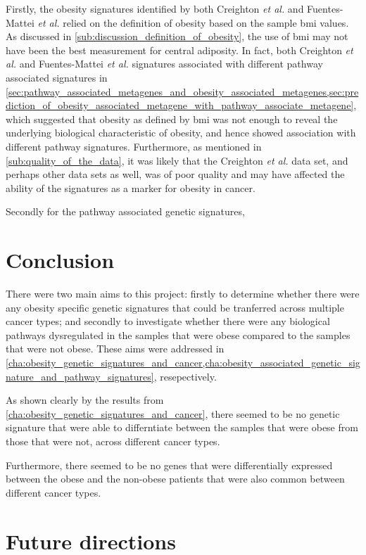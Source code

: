 Firstly, the obesity signatures identified by both Creighton \textit{et al.} and Fuentes-Mattei \textit{et al.} relied on the definition of obesity based on the sample \gls{bmi} values.
As discussed in \cref{sub:discussion_definition_of_obesity}, the use of \gls{bmi} may not have been the best measurement for central adiposity.
In fact, both Creighton \textit{et al.} and Fuentes-Mattei \textit{et al.} signatures associated with different pathway associated signatures in \cref{sec:pathway_associated_metagenes_and_obesity_associated_metagenes,sec:prediction_of_obesity_associated_metagene_with_pathway_associate_metagene}, which suggested that obesity as defined by \gls{bmi} was not enough to reveal the underlying biological characteristic of obesity, and hence showed association with different pathway signatures.
Furthermore, as mentioned in \cref{sub:quality_of_the_data}, it was likely that the Creighton \textit{et al.} data set, and perhaps other data sets as well, was of poor quality and may have affected the ability of the signatures as a marker for obesity in cancer.

Secondly for the pathway associated genetic signatures, 

















\section{Conclusion}
\label{sec:conclusion}

There were two main aims to this project: firstly to determine whether there were any obesity specific genetic signatures that could be tranferred across multiple cancer types; and secondly to investigate whether there were any biological pathways dysregulated in the samples that were obese compared to the samples that were not obese.
These aims were addressed in \cref{cha:obesity_genetic_signatures_and_cancer,cha:obesity_associated_genetic_signature_and_pathway_signatures}, resepectively.

As shown clearly by the results from \cref{cha:obesity_genetic_signatures_and_cancer}, there seemed to be no  genetic signature that were able to differntiate between the samples that were obese from those that were not, across different cancer types.

Furthermore, there seemed to be no genes that were differentially expressed between the obese and the non-obese patients that were also common between different cancer types.





\section{Future directions}
\label{sec:future_directions}













